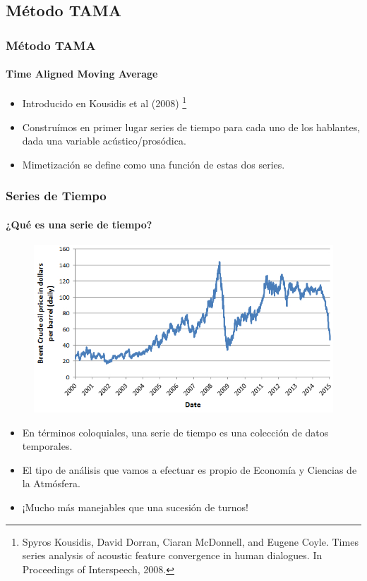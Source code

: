 \subsection{Método TAMA}

\begin{frame}
  \frametitle{Método TAMA}
  \framesubtitle{Time Aligned Moving Average}
  \begin{itemize}
    \item Introducido en Kousidis et al (2008) \footnote{Spyros Kousidis, David Dorran, Ciaran McDonnell, and Eugene Coyle. Times series analysis of acoustic feature convergence in human dialogues. In
Proceedings of Interspeech, 2008.}
    \item Construímos en primer lugar series de tiempo para cada uno de los hablantes, dada una variable acústico/prosódica.
    \item Mimetización se define como una función de estas dos series.
  \end{itemize}
\end{frame}


\begin{frame}
  \frametitle{Series de Tiempo}
  \framesubtitle{¿Qué es una serie de tiempo?}

  \begin{figure}[t]
    \includegraphics[scale=0.35]{images/oil_price.jpg}
  \end{figure}

  \begin{itemize}
     \item En términos coloquiales, una serie de tiempo es una colección de datos temporales.
     \item El tipo de análisis que vamos a efectuar es propio de Economía y Ciencias de la Atmósfera.
     \item ¡Mucho más manejables que una sucesión de turnos!
   \end{itemize}
\end{frame}



